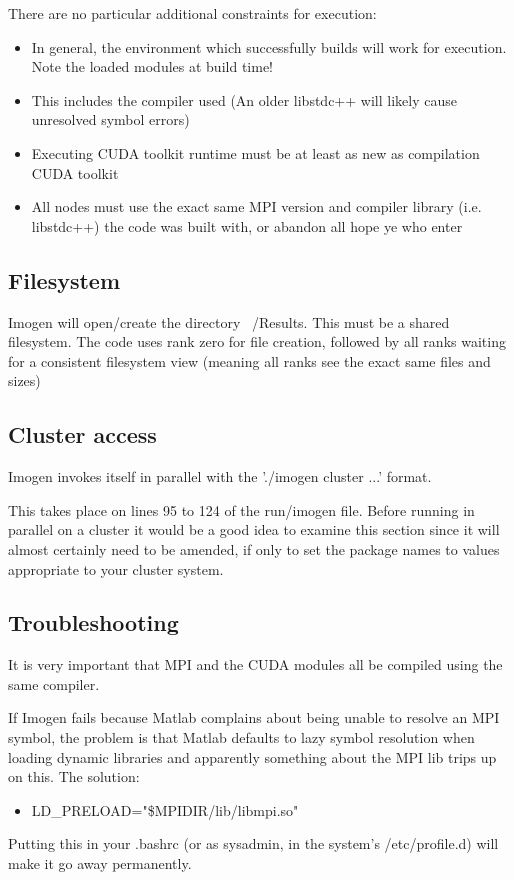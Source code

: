 \documentclass[letterpaper,12pt]{article}
\begin{document}
There are no particular additional constraints for execution:
\begin{itemize}
\item In general, the environment which successfully builds will work for execution. Note the loaded modules at build time!
\item This includes the compiler used (An older libstdc++ will likely cause unresolved symbol errors)
\item Executing CUDA toolkit runtime must be at least as new as compilation CUDA toolkit
\item All nodes must use the exact same MPI version and compiler library (i.e. libstdc++) the code was built with, or abandon all hope ye who enter
\end{itemize}


\subsection{Filesystem}

Imogen will open/create the directory ~/Results. This must be a shared filesystem.
The code uses rank zero for file creation, followed by all ranks waiting for a
consistent filesystem view (meaning all ranks see the exact same files and sizes)

\subsection{Cluster access}

Imogen invokes itself in parallel with the './imogen cluster ...' format.

This takes place on lines 95 to 124 of the run/imogen file. Before running
in parallel on a cluster it would be a good idea to examine this section since
it will almost certainly need to be amended, if only to set the package
names to values appropriate to your cluster system.

\subsection{Troubleshooting}

It is very important that MPI and the CUDA modules all be compiled
using the same compiler.

If Imogen fails because Matlab complains about being unable to resolve an MPI
symbol, the problem is that Matlab defaults to lazy symbol resolution when
loading dynamic libraries and apparently something about the MPI lib trips
up on this. The solution:
\begin{itemize} \item LD\_PRELOAD="\$MPIDIR/lib/libmpi.so"
\end{itemize}
Putting this in your .bashrc (or as sysadmin, in the system's /etc/profile.d) will
make it go away permanently.
\end{document}
